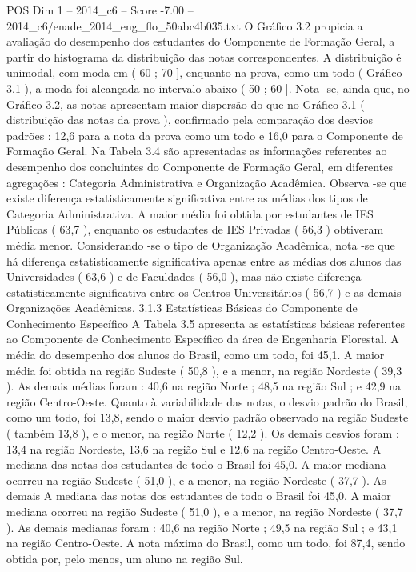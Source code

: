 \begin{textsample}{POS Dim 1 – 2014\_c6 – Score -7.00 – 2014\_c6/enade\_2014\_eng\_flo\_50abc4b035.txt}
O Gráfico 3.2 propicia a avaliação do desempenho dos estudantes do Componente de Formação Geral, a partir do histograma da distribuição das notas correspondentes.
A distribuição é unimodal, com moda em ( 60 ; 70 ], enquanto na prova, como um todo ( Gráfico 3.1 ), a moda foi alcançada no intervalo abaixo ( 50 ; 60 ].
Nota -se, ainda que, no Gráfico 3.2, as notas apresentam maior dispersão do que no Gráfico 3.1 ( distribuição das notas da prova ), confirmado pela comparação dos desvios padrões : 12,6 para a nota da prova como um todo e 16,0 para o Componente de Formação Geral.
Na Tabela 3.4 são apresentadas as informações referentes ao desempenho dos concluintes do Componente de Formação Geral, em diferentes agregações : Categoria Administrativa e Organização Acadêmica.
Observa -se que existe diferença estatisticamente significativa entre as médias dos tipos de Categoria Administrativa.
A maior média foi obtida por estudantes de IES Públicas ( 63,7 ), enquanto os estudantes de IES Privadas ( 56,3 ) obtiveram média menor.
Considerando -se o tipo de Organização Acadêmica, nota -se que há diferença estatisticamente significativa apenas entre as médias dos alunos das Universidades ( 63,6 ) e de Faculdades ( 56,0 ), mas não existe diferença estatisticamente significativa entre os Centros Universitários ( 56,7 ) e as demais Organizações Acadêmicas. 3.1.3 Estatísticas Básicas do Componente de Conhecimento Específico A Tabela 3.5 apresenta as estatísticas básicas referentes ao Componente de Conhecimento Específico da área de Engenharia Florestal.
A média do desempenho dos alunos do Brasil, como um todo, foi 45,1.
A maior média foi obtida na região Sudeste ( 50,8 ), e a menor, na região Nordeste ( 39,3 ).
As demais médias foram : 40,6 na região Norte ; 48,5 na região Sul ; e 42,9 na região Centro-Oeste.
Quanto à variabilidade das notas, o desvio padrão do Brasil, como um todo, foi 13,8, sendo o maior desvio padrão observado na região Sudeste ( também 13,8 ), e o menor, na região Norte ( 12,2 ).
Os demais desvios foram : 13,4 na região Nordeste, 13,6 na região Sul e 12,6 na região Centro-Oeste.
A mediana das notas dos estudantes de todo o Brasil foi 45,0.
A maior mediana ocorreu na região Sudeste ( 51,0 ), e a menor, na região Nordeste ( 37,7 ).
As demais A mediana das notas dos estudantes de todo o Brasil foi 45,0.
A maior mediana ocorreu na região Sudeste ( 51,0 ), e a menor, na região Nordeste ( 37,7 ).
As demais medianas foram : 40,6 na região Norte ; 49,5 na região Sul ; e 43,1 na região Centro-Oeste.
A nota máxima do Brasil, como um todo, foi 87,4, sendo obtida por, pelo menos, um aluno na região Sul.

\end{textsample}
